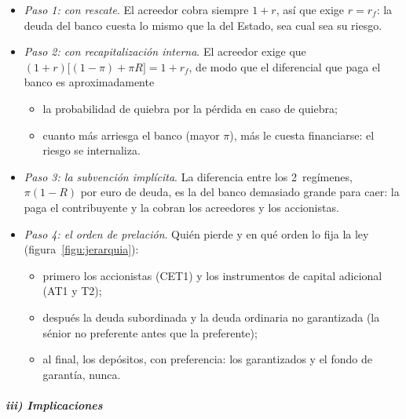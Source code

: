 \documentclass[11pt]{article}
\begin{document}
\begin{itemize}
\item \emph{Paso 1: con rescate}. El acreedor cobra siempre $1+r$, así que exige $r=r_f$: la deuda del banco cuesta lo mismo que la del Estado, sea cual sea su riesgo.
\item \emph{Paso 2: con recapitalización interna}. El acreedor exige que $(1+r)\big[(1-\pi)+\pi R\big]=1+r_f$, de modo que el diferencial que paga el banco es aproximadamente
  \begin{itemize}
  \item la probabilidad de quiebra por la pérdida en caso de quiebra;
  \item cuanto más arriesga el banco (mayor $\pi$), más le cuesta financiarse: el riesgo se internaliza.
  \end{itemize}
\item \emph{Paso 3: la subvención implícita}. La diferencia entre los 2~regímenes, $\pi(1-R)$ por euro de deuda, es la  del banco demasiado grande para caer: la paga el contribuyente y la cobran los acreedores y los accionistas.
\item \emph{Paso 4: el orden de prelación}. Quién pierde y en qué orden lo fija la ley (figura~\ref{figu:jerarquia}):
  \begin{itemize}
  \item primero los accionistas (CET1) y los instrumentos de capital adicional (AT1 y T2);
  \item después la deuda subordinada y la deuda ordinaria no garantizada (la sénior no preferente antes que la preferente);
  \item al final, los depósitos, con preferencia: los garantizados y el fondo de garantía, nunca.
  \end{itemize}
\end{itemize}

\begin{infografia}[H]
\centering
\caption{La recapitalización interna: el orden en que se absorben las pérdidas}\label{figu:jerarquia}
\end{infografia}

\subparagraph{iii) Implicaciones}
\end{document}
